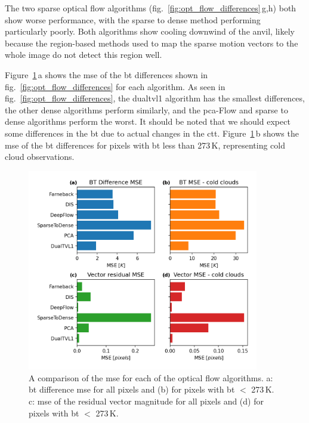 The two sparse optical flow algorithms (fig.~\ref{fig:opt_flow_differences}\,g,h) both show worse performance, with the sparse to dense method performing particularly poorly.
Both algorithms show cooling downwind of the anvil, likely because the region-based methods used to map the sparse motion vectors to the whole image do not detect this region well.

Figure~\ref{fig:opt_flow_mse}\,a shows the \acrshort{mse} of the \acrshort{bt} differences shown in fig.~\ref{fig:opt_flow_differences} for each algorithm.
As seen in fig.~\ref{fig:opt_flow_differences}, the \acrshort{dualtvl1} algorithm has the smallest differences, the other dense algorithms perform similarly, and the \acrshort{pca}-Flow and sparse to dense algorithms perform the worst.
It should be noted that we should expect some differences in the \acrshort{bt} due to actual changes in the \acrshort{ctt}.
Figure~\ref{fig:opt_flow_mse}\,b shows the \acrshort{mse} of the \acrshort{bt} differences for pixels with \acrshort{bt} less than 273\,\unit{K}, representing cold cloud observations.


\begin{figure}[tp]
    \includegraphics[width=0.9\textwidth]{figures/chapter1_12.png}
    \caption[
    A comparison of the \acrshort{bt} difference and residual vector magnitude \acrshort{mse} for each of the optical flow algorithms
    ]{
    A comparison of the \acrshort{mse} for each of the optical flow algorithms. a: \acrshort{bt} difference \acrshort{mse} for all pixels and (b) for pixels with \acrshort{bt} $<$ 273\,\unit{K}. c: \acrshort{mse} of the residual vector magnitude for all pixels and (d) for pixels with \acrshort{bt} $<$ 273\,\unit{K}.
    }
    \label{fig:opt_flow_mse}
\end{figure}


